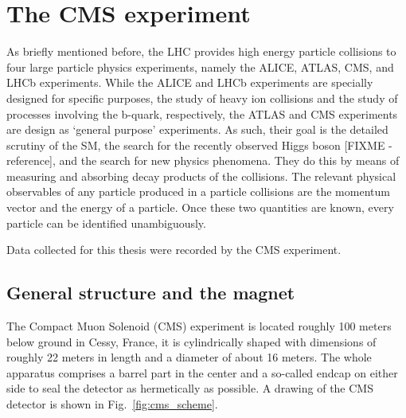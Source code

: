 \section{The CMS experiment}
\label{sec:cms}
As briefly mentioned before, the LHC provides high energy particle collisions to four large particle physics experiments, namely
the ALICE, ATLAS, CMS, and LHCb experiments. While the ALICE and LHCb experiments are specially designed for specific purposes,
the study of heavy ion collisions and the study of processes involving the b-quark, respectively, the ATLAS and CMS experiments
are design as `general purpose' experiments. As such, their goal is the detailed scrutiny of the SM, the search for the recently observed
Higgs boson [FIXME - reference], and the search for new physics phenomena. They do this by means of measuring and absorbing decay products
of the collisions. The relevant physical observables of any particle produced in a particle collisions are the momentum vector
and the energy of a particle. Once these two quantities are known, every particle can be identified unambiguously. 

Data collected for this thesis were recorded by the CMS experiment.

\subsection{General structure and the magnet}
\label{sub:cms_general}
The Compact Muon Solenoid (CMS) experiment is located roughly 100 meters below ground in Cessy, France,
it is cylindrically shaped with dimensions of roughly 22 meters in length and a diameter of about 16 meters. 
The whole apparatus comprises a barrel part in the center and a so-called endcap on either side to seal the detector as hermetically as possible.
A drawing of the CMS detector is shown in Fig.~\ref{fig:cms_scheme}. 


